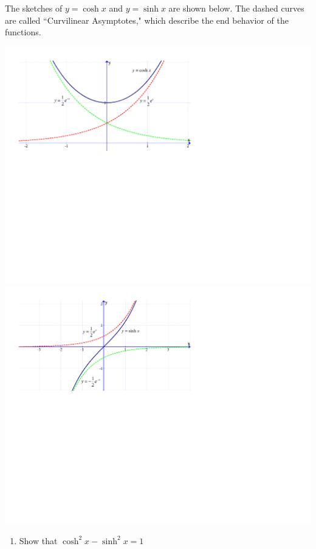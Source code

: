 \documentclass[12pt]{article}
\begin{document}
\begin{enumerate}
\smallskip

The sketches of $y=\cosh{x}$ and $y=\sinh{x}$ are shown below.  The dashed curves are called ``Curvilinear Asymptotes," which describe the end behavior of the functions.
\begin{center}
\includegraphics[scale=0.6]{cosh.pdf}\\
\vspace{0.5 cm}
\includegraphics[scale=0.6]{sinh.pdf}
\end{center}

\begin{enumerate}

\item Show that $\cosh^2{x}-\sinh^2{x}=1$


\end{enumerate}
\end{enumerate}
\end{document}
